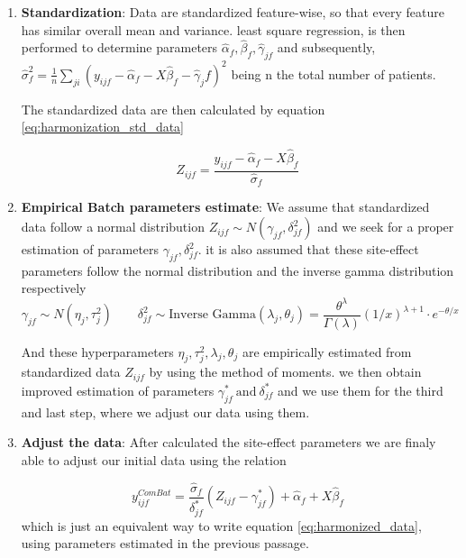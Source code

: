 \documentclass[11pt]{report}
\begin{document}
\begin{enumerate}
\item \textbf{Standardization}: Data are standardized feature-wise, so that every feature has similar overall mean and variance.
least square regression, is then performed to determine parameters $\hat \alpha_f, \hat \beta_f, \hat \gamma_{jf}$ and subsequently, $\hat \sigma^2_f = \frac{1}{n} \sum_{ji} \left ( y_{ijf} - \hat \alpha_f - X \hat \beta_f - \hat \gamma_jf \right )^2$ being n the total number of patients.


The standardized data are then calculated by equation \ref{eq:harmonization_std_data}

\begin{equation}\label{eq:harmonization_std_data}
Z_{ijf} = \frac{y_{ijf}-\hat \alpha_f - X \hat \beta_f}{\hat \sigma_f}
\end{equation}


\item \textbf{Empirical Batch parameters estimate}:
We assume that standardized data follow a normal distribution $Z_{ijf} \sim N(\gamma_{jf}, \delta^2_{jf})$ and we seek for a proper estimation of parameters $\gamma_{jf}, \delta^2_{jf}$.
it is also assumed that these site-effect parameters follow the normal distribution and the inverse gamma distribution respectively
\[
\gamma_{jf} \sim N(\eta_j, \tau^2_j)  \qquad \delta^2_{jf} \sim \text{Inverse Gamma}(\lambda_j, \theta_j) =  \frac{\theta^{\lambda}}{\Gamma (\lambda)}(1/x)^{\lambda +1}\cdot e^{-\theta/x}
\]

And these hyperparameters $\eta_j, \tau^2_j, \lambda_j, \theta_j$ are empirically estimated from standardized data  $Z_{ijf}$ by using the method of moments.
we then obtain improved estimation of parameters $\gamma^\ast_{jf} \ \text{and} \ \delta^\ast_{jf}$ and we use them for the third and last step, where we adjust our data using them.

\item \textbf{Adjust the data}: After calculated the site-effect parameters we are finaly able to adjust our initial data using the relation

\begin{equation}
y^{ComBat}_{ijf} = \frac{\hat \sigma_f}{\delta^\ast_{jf}}(Z_{ijf} - \gamma^\ast_{jf}) + \hat \alpha_f + X \hat \beta_f
\end{equation}
which is just an equivalent way to write equation \ref{eq:harmonized_data}, using parameters estimated in the previous passage.
\end{enumerate}
\end{document}
